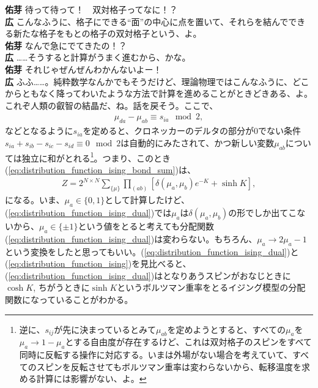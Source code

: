 \documentclass[paper=b5j,fontsize=12Q,jafontsize=12Q,baselineskip=21Q]{jlreq}
\DeclareRobustCommand{\hiron}{\textbf{広 }}
\DeclareRobustCommand{\umen}{\textbf{佑芽 }}
\begin{document}
\begin{refsection}

\umen 待って待って！　双対格子ってなに！？
\\\hiron こんなふうに、格子にできる``面''の中心に点を置いて、それらを結んでできる新たな格子をもとの格子の双対格子という、よ。
\\\umen なんで急にでてきたの！？
\\\hiron ……そうすると計算がうまく進むから、かな。
\\\umen それじゃぜんぜんわかんないよー！
\\\hiron ふふ……。純粋数学なんかでもそうだけど、理論物理ではこんなふうに、どこからともなく降ってわいたような方法で計算を進めることがときどきある、よ。これぞ人類の叡智の結晶だ、ね。話を戻そう。ここで、
\begin{align}
  \mu_{da}-\mu_{ab}\equiv s_{ia}\mod 2,
\end{align}
などとなるように$s_{ia}$を定めると、クロネッカーのデルタの部分が0でない条件$s_{ia}+s_{ib}-s_{ic}-s_{id}\equiv0\mod 2$は自動的にみたされて、かつ新しい変数$\mu_{ab}$については独立に和がとれる\footnote{逆に、$s_{ij}$が先に決まっているとみて$\mu_{ab}$を定めようとすると、すべての$\mu_a$を$\mu_a\to1-\mu_a$とする自由度が存在するけど、これは双対格子のスピンをすべて同時に反転する操作に対応する。いまは外場がない場合を考えていて、すべてのスピンを反転させてもボルツマン重率は変わらないから、転移温度を求める計算には影響がない、よ。}。つまり、このとき(\ref{eq:distribution_function_ising_bond_sum})は、
\begin{align}
  Z=2^{N\times N}\sum_{\{\mu\}}\prod_{(ab)}\left[\delta(\mu_a,\mu_b)e^{-K}+\sinh K\right],\label{eq:distribution_function_ising_dual}
\end{align}
になる。いま、$\mu_a\in\{0,1\}$として計算したけど、(\ref{eq:distribution_function_ising_dual})では$\mu_a$は$\delta(\mu_a,\mu_b)$の形でしか出てこないから、$\mu_a\in\{\pm1\}$という値をとると考えても分配関数(\ref{eq:distribution_function_ising_dual})は変わらない。もちろん、$\mu_a\to2\mu_a-1$という変換をしたと思ってもいい。(\ref{eq:distribution_function_ising_dual})と(\ref{eq:distribution_function_ising})を見比べると、(\ref{eq:distribution_function_ising_dual})はとなりあうスピンがおなじときに$\cosh K$, ちがうときに$\sinh K$というボルツマン重率をとるイジング模型の分配関数になっていることがわかる。

\end{refsection}
\end{document}
